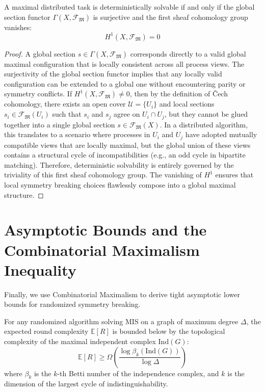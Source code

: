 \begin{theorem}
A maximal distributed task is deterministically solvable if and only if the global section functor $\Gamma(X, \mathscr{F}_{\mathfrak{M}})$ is surjective and the first sheaf cohomology group vanishes:
\[
H^1(X, \mathscr{F}_{\mathfrak{M}}) = 0
\]
\end{theorem}

\begin{proof}
A global section $s \in \Gamma(X, \mathscr{F}_{\mathfrak{M}})$ corresponds directly to a valid global maximal configuration that is locally consistent across all process views.
The surjectivity of the global section functor implies that any locally valid configuration can be extended to a global one without encountering parity or symmetry conflicts.
If $H^1(X, \mathscr{F}_{\mathfrak{M}}) \neq 0$, then by the definition of \v{C}ech cohomology, there exists an open cover $\mathcal{U} = \{U_i\}$ and local sections $s_i \in \mathscr{F}_{\mathfrak{M}}(U_i)$ such that $s_i$ and $s_j$ agree on $U_i \cap U_j$, but they cannot be glued together into a single global section $s \in \mathscr{F}_{\mathfrak{M}}(X)$.
In a distributed algorithm, this translates to a scenario where processes in $U_i$ and $U_j$ have adopted mutually compatible views that are locally maximal, but the global union of these views contains a structural cycle of incompatibilities (e.g., an odd cycle in bipartite matching).
Therefore, deterministic solvability is entirely governed by the triviality of this first sheaf cohomology group. The vanishing of $H^1$ ensures that local symmetry breaking choices flawlessly compose into a global maximal structure.
\end{proof}

\section{Asymptotic Bounds and the Combinatorial Maximalism Inequality}

Finally, we use Combinatorial Maximalism to derive tight asymptotic lower bounds for randomized symmetry breaking.

\begin{theorem}
For any randomized algorithm solving MIS on a graph of maximum degree $\Delta$, the expected round complexity $\mathbb{E}[R]$ is bounded below by the topological complexity of the maximal independent complex $\text{Ind}(G)$:
\[
\mathbb{E}[R] \ge \Omega\left( \frac{\log \beta_k(\text{Ind}(G))}{\log \Delta} \right)
\]
where $\beta_k$ is the $k$-th Betti number of the independence complex, and $k$ is the dimension of the largest cycle of indistinguishability.
\end{theorem}

